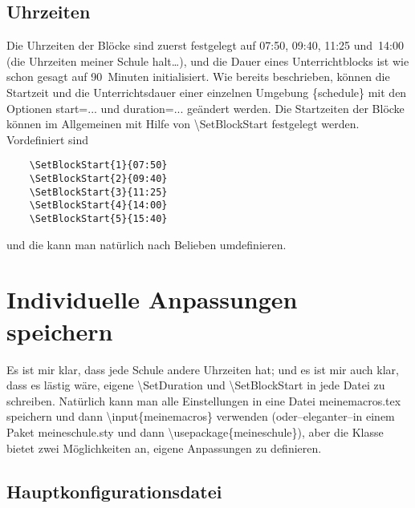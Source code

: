 \documentclass[hyperworksheet]{drcschool}
\newcommand*{\cs}[1]{\textup{\ttfamily\textbackslash#1}}                        %
\newcommand*{\opt}[1]{\textup{\ttfamily#1}}                                     %
\newcommand*{\env}[1]{\textup{\ttfamily\{#1\}}}                                 %
\begin{document}
\subsection{Uhrzeiten}
Die Uhrzeiten der Blöcke sind zuerst festgelegt auf 07:50, 09:40, 11:25 und~14:00
(die Uhrzeiten meiner Schule halt\ldots), und die Dauer eines Unterrichtblocks ist
wie schon gesagt auf 90~Minuten initialisiert. Wie bereits beschrieben, können die Startzeit
und die Unterrichtsdauer einer einzelnen Umgebung \env{schedule} mit den Optionen \opt{start=...}
und \opt{duration=...} geändert werden. Die Startzeiten der Blöcke können im Allgemeinen
mit Hilfe von \cs{SetBlockStart} festgelegt werden. Vordefiniert sind
\begin{verbatim}
    \SetBlockStart{1}{07:50}
    \SetBlockStart{2}{09:40}
    \SetBlockStart{3}{11:25}
    \SetBlockStart{4}{14:00}
    \SetBlockStart{5}{15:40}
\end{verbatim}
und die kann man natürlich nach Belieben umdefinieren.

\section{Individuelle Anpassungen speichern}
Es ist mir klar, dass jede Schule andere Uhrzeiten hat; und es ist mir auch klar,
dass es lästig wäre, eigene \cs{SetDuration} und \cs{SetBlockStart} in jede
Datei zu schreiben. Natürlich kann man alle Einstellungen in eine Datei \opt{meinemacros.tex}
speichern und dann \cs{input\{meinemacros\}} verwenden
(oder--eleganter--in einem Paket \opt{meineschule.sty} und dann \cs{usepackage\{meineschule\}}),
aber die Klasse bietet zwei
Möglichkeiten an, eigene Anpassungen zu definieren.

\subsection{Hauptkonfigurationsdatei}
\end{document}
